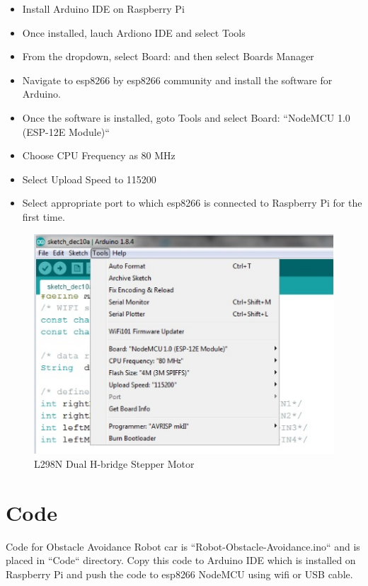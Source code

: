 \documentclass[sigconf]{acmart}
\begin{document}
\begin{itemize}

\item Install Arduino IDE on Raspberry Pi
\item Once installed, lauch Ardiono IDE and select Tools
\item From the dropdown, select Board:  and then select Boards Manager
\item Navigate to esp8266 by esp8266 community and install the
  software for Arduino.
\item Once the software is installed, goto Tools and select Board:
  ``NodeMCU 1.0 (ESP-12E Module)``
\item Choose CPU Frequency as 80 MHz
\item Select Upload Speed to 115200
\item Select appropriate port to which esp8266 is connected to
  Raspberry Pi for the first time.

\end{itemize}

\begin{figure}
	\includegraphics[width=1.0\columnwidth]{images/Arduino-settings.jpg}
	\caption{L298N Dual H-bridge Stepper Motor}
\end{figure}

\section{Code}
Code for Obstacle Avoidance Robot car is ``Robot-Obstacle-Avoidance.ino`` and is placed in ``Code`` directory. Copy this code to Arduino IDE which is installed on Raspberry Pi and push the code to esp8266 NodeMCU using wifi or USB cable.
\end{document}
